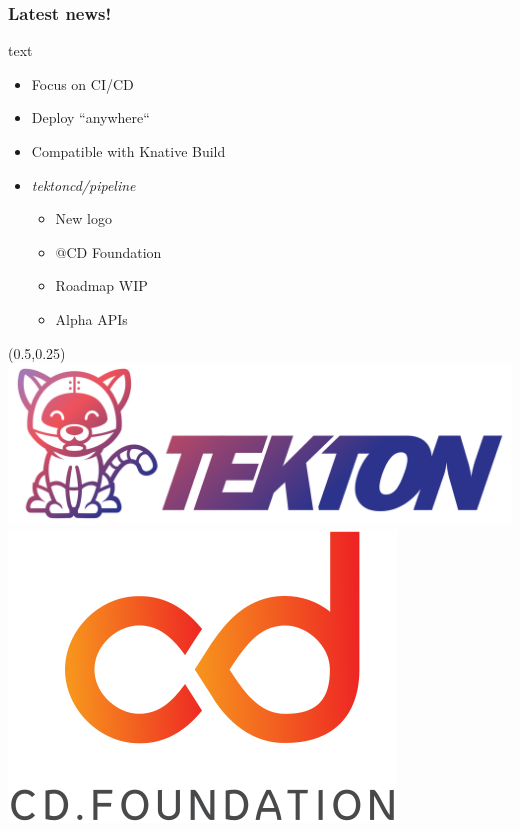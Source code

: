 \documentclass[aspectratio=169,11pt,hyperref={colorlinks=true}]{beamer}
\begin{document}
\begin{lblackrwhiteframe}
\begin{lblackrwhiteframe}
  \frametitle{Latest news!}
  \large
  \begin{beamercolorbox}[wd=0.3\paperwidth]{text}
    \begin{itemize}
      \item Focus on CI/CD
      \item Deploy ``anywhere``
      \item Compatible with Knative Build
    \end{itemize}
    \begin{itemize}
      \item {\em tektoncd/pipeline}
      \begin{itemize}
        \item New logo
        \item @CD Foundation
        \item Roadmap WIP
        \item Alpha APIs
      \end{itemize}
    \end{itemize}
  \end{beamercolorbox}%
  \begin{textblock*}{0.5\paperwidth}(0.5\paperwidth,0.25\paperheight)
    \centering
    \includegraphics[width=0.35\paperwidth]{img/tekton-horizontal-color.png}
    \includegraphics[width=0.20\paperwidth]{img/cdf-color.png}
  \end{textblock*}
\end{lblackrwhiteframe}


\end{lblackrwhiteframe}
\end{document}
